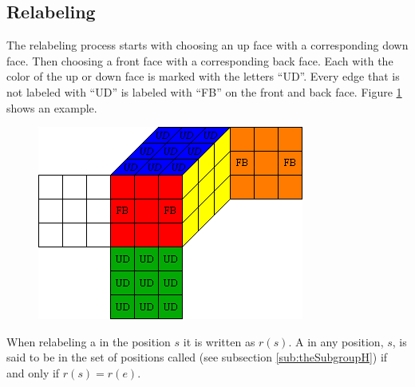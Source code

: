 \subsection{Relabeling}
The relabeling process  starts with choosing an up face with a corresponding down face. Then choosing a front face with a corresponding back face. Each \facelet{} with the color of the up or down face is marked with the letters ``UD''.  %
Every edge \cpiece{} that is not labeled with ``UD'' is labeled with ``FB'' on the front and back face.
Figure \ref{fig:relabelClean} shows an example.
\vspace{-1mm}
\begin{figure}[!hbt]
	\centering
		\includegraphics[scale = 0.44]{input/pics/relabelClean}
	\caption{}
	\label{fig:relabelClean}
\end{figure}
\vspace{-2mm}
When relabeling a \rubik{} in the position $s$ it is written as $r(s)$. A \rubik{} in any position, $s$, is said to be in the set of positions called  (see subsection \ref{sub:theSubgroupH}) if and only if $r(s)=r(e)$.
\vspace{-2mm}
